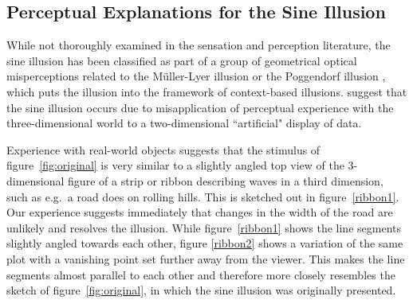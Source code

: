 \documentclass[11pt]{isuthesis}\usepackage[]{graphicx}\usepackage[]{color}
\begin{document}
\subsection{Perceptual Explanations for the Sine Illusion}\label{perceptualexplanations}\hfill\newline
While not thoroughly examined in the sensation and perception literature, the sine illusion has been classified as part of a group of geometrical optical misperceptions  related to the M\"uller-Lyer illusion \citep{day:1991} or the Poggendorf illusion \citep{poggendorf}, which puts the illusion into the framework of context-based illusions. \citet{day:1991} suggest that the sine illusion occurs due to misapplication of perceptual experience with the three-dimensional world to a two-dimensional ``artificial" display of data.  

Experience with real-world objects suggests that the stimulus of figure~\ref{fig:original} is very similar to a slightly angled top view of the 3-dimensional figure of a strip or ribbon describing waves in a third dimension, such as e.g.~a road does on rolling hills. This is sketched out in figure~\ref{ribbon1}. Our experience suggests immediately that changes in the width of the road are unlikely and resolves the illusion. While figure~\ref{ribbon1} shows the line segments slightly angled towards each other, figure \ref{ribbon2} shows a variation of the same plot with a  vanishing point set further away from the viewer. This makes the line segments almost parallel to each other and therefore more closely resembles the sketch of figure~\ref{fig:original}, in which the sine illusion was originally presented.



% 
\end{document}
